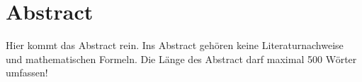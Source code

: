 
\chapter*{Abstract}


Hier kommt das Abstract rein. Ins Abstract gehören keine Literaturnachweise und mathematischen Formeln. Die Länge des Abstract darf maximal 500 Wörter umfassen!
